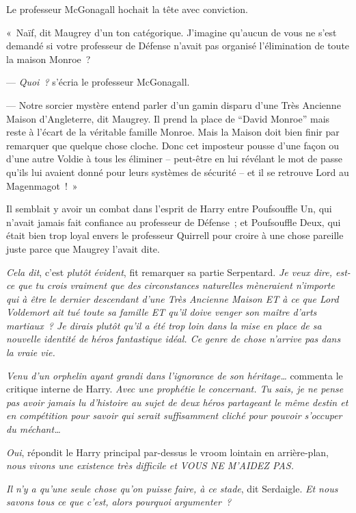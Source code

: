 Le professeur McGonagall hochait la tête avec conviction.

«~Naïf, dit Maugrey d'un ton catégorique.
J'imagine qu'aucun de vous ne s'est demandé si votre professeur de Défense n'avait pas organisé l'élimination de toute la maison Monroe~?

--- \emph{Quoi~?} s'écria le professeur McGonagall.

--- Notre sorcier mystère entend parler d'un gamin disparu d'une Très Ancienne Maison d'Angleterre, dit Maugrey.
Il prend la place de “David Monroe” mais reste à l'écart de la véritable famille Monroe.
Mais la Maison doit bien finir par remarquer que quelque chose cloche.
Donc cet imposteur pousse d'une façon ou d'une autre Voldie à tous les éliminer -- peut-être en lui révélant le mot de passe qu'ils lui avaient donné pour leurs systèmes de sécurité -- et il se retrouve Lord au Magenmagot~!~»

Il semblait y avoir un combat dans l'esprit de Harry entre Poufsouffle Un, qui n'avait jamais fait confiance au professeur de Défense~; et Poufsouffle Deux, qui était bien trop loyal envers le professeur Quirrell pour croire à une chose pareille juste parce que Maugrey l'avait dite.

\emph{Cela dit}, c'est \emph{plutôt évident}, fit remarquer sa partie Serpentard.
\emph{Je veux dire, est-ce que tu crois vraiment que des circonstances naturelles mèneraient n'importe qui à être le dernier descendant d'une Très Ancienne Maison ET à ce que Lord Voldemort ait tué toute sa famille ET qu'il doive venger son maître d'arts martiaux~?
Je dirais plutôt qu'il a été trop loin dans la mise en place de sa nouvelle identité de héros fantastique idéal.
Ce genre de chose n'arrive pas dans la vraie vie.}

\emph{Venu d'un orphelin ayant grandi dans l'ignorance de son héritage…} commenta le critique interne de Harry.
\emph{Avec une prophétie le concernant.
Tu sais, je ne pense pas avoir jamais lu d'histoire au sujet de deux héros partageant le même destin et en compétition pour savoir qui serait suffisamment cliché pour pouvoir s'occuper du méchant…}

\emph{Oui}, répondit le Harry principal par-dessus le vroom lointain en arrière-plan, \emph{nous vivons une existence très difficile et VOUS NE M'AIDEZ PAS.}

\emph{Il n'y a qu'une seule chose qu'on puisse faire, à ce stade}, dit Serdaigle.
\emph{Et nous savons tous ce que c'est, alors pourquoi argumenter~?}

